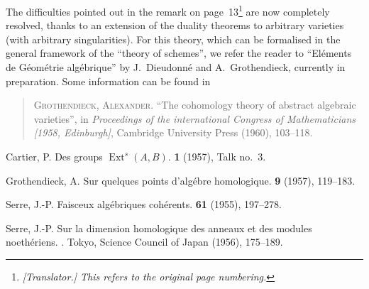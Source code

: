 \documentclass{article}
\theoremstyle{plain}
\theoremstyle{definition}
\DeclareMathOperator{\Ext}{Ext}
\begin{document}
The difficulties pointed out in the remark on page~13\footnote{\emph{[Translator.] This refers to the original page numbering.}} are now completely resolved, thanks to an extension of the duality theorems to arbitrary varieties (with arbitrary singularities).
For this theory, which can be formalised in the general framework of the ``theory of schemes'', we refer the reader to ``El\'{e}ments de G\'{e}om\'{e}trie alg\'{e}brique'' by J.~Dieudonn\'{e} and A.~Grothendieck, currently in preparation.
Some information can be found in

\begin{quote}
  \textsc{Grothendieck, Alexander.} ``The cohomology theory of abstract algebraic varieties'', in \emph{Proceedings of the international Congress of Mathematicians [1958, Edinburgh]}, Cambridge University Press (1960), 103--118.
\end{quote}

\noindent[April, 1959]



\nocite{*}
% 
\begin{thebibliography}{4}

  {\sc Cartier, P.}
  \newblock Des groups $\Ext^s(A,B)$.
   \textbf{1} (1957), Talk no.~3.

  {\sc Grothendieck, A.}
  \newblock Sur quelques points d'alg\'{e}bre homologique.
   {\bf 9} (1957), 119--183.

  {\sc Serre, J.-P.}
  \newblock Faisceux alg\'{e}briques coh\'{e}rents.
   {\bf 61} (1955), 197--278.

  {\sc Serre, J.-P.}
  \newblock Sur la dimension homologique des anneaux et des modules noeth\'{e}riens.
  .
  \newblock Tokyo, Science Council of Japan (1956), 175--189.

\end{thebibliography}
\end{document}
